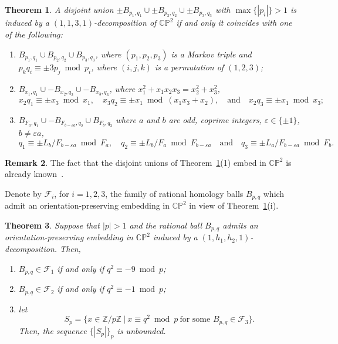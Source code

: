 \documentclass[11pt,a4paper]{amsart}
\newcommand{\CP}{\mathbb{CP}}
\newcommand{\Z}{\mathbb Z}
\newcommand{\F}{\mathcal F}
\newcommand{\ep}{\varepsilon}
\newtheorem{thm}{Theorem}[section]
\theoremstyle{definition}
\newtheorem{rmk}[thm]{Remark}
\numberwithin{equation}{section}
\begin{document}
\begin{thm}\label{t:disj-emb} 
A disjoint union $\pm B_{p_1,q_1}\cup\pm B_{p_2,q_2}\cup\pm B_{p_3,q_3}$ with 
$\max\{|p_i|\}>1$ is induced by a $(1,1,3,1)$-decomposition of 
$\CP^2$ if and only it coincides with one of the following:
\begin{enumerate}
\item[(1)] 
$B_{p_1,q_1}\cup B_{p_2,q_2}\cup B_{p_3,q_3}$, where $(p_1,p_2,p_3)$ is a Markov triple and 
$p_k q_i\equiv \pm 3 p_j\bmod p_i$,
where $(i,j,k)$ is a permutation of $(1,2,3)$; 
\item[(2)]
$B_{x_1,q_1}\cup -B_{x_2,q_2}\cup -B_{x_3,q_3}$, where $x_1^2+x_1 x_2 x_3 = x_2^2+x_3^2$, 
\[
x_2 q_1\equiv\pm x_3 \bmod x_1,\quad  
x_3 q_2\equiv\pm x_1\bmod(x_1 x_3 + x_2),\quad\text{and}\quad 
x_2 q_3\equiv\pm x_1\bmod x_3;
\]
\item[(3)]
$B_{F_a,q_1}\cup -B_{F_{b-\ep a},q_2}\cup B_{F_b,q_3}$
where $a$ and $b$ are odd, coprime integers, $\ep\in\{\pm 1\}$, $b \neq \ep a$, 
\[
q_1\equiv\pm L_b/F_{b-\ep a}\bmod F_a,\quad   
q_2\equiv\pm L_b/F_a\bmod F_{b-\ep a}\quad\text{and}\quad 
q_3\equiv\pm L_a/F_{b-\ep a}\bmod F_b.
\]
\end{enumerate}
\end{thm} 

\begin{rmk}\label{r:knownemb} 
The fact that the disjoint unions of Theorem~\ref{t:disj-emb}(1) embed 
in $\CP^2$ is already known~\cite{HP10}. 
\end{rmk}

Denote by $\F_i$, for $i=1,2,3$, the family of rational homology balls 
$B_{p,q}$ which admit an orientation-preserving embedding in $\CP^2$ in view of  
Theorem~\ref{t:disj-emb}(i). 

\begin{thm}\label{t:manyballs}
Suppose that $|p|>1$ and the rational ball $B_{p,q}$ admits an 
orientation-preserving embedding in $\CP^2$ induced by  
a $(1,h_1,h_2,1)$-decomposition. Then, 
\begin{enumerate} 
\item[(1)]
$B_{p,q}\in\F_1$ if and only if $q^2\equiv -9\bmod p$;
\item[(2)] 
$B_{p,q}\in\F_2$ if and only if $q^2\equiv -1\bmod p$;
\item[(3)] 
let 
\[
S_p = \{x\in\Z/p\Z\ |\ x\equiv q^2\bmod p\ \text{for some $B_{p,q}\in\F_3$}\}.
\]
Then, the sequence $\{|S_p|\}_p$ is unbounded.
\end{enumerate} 
\end{thm}  
\end{document}
